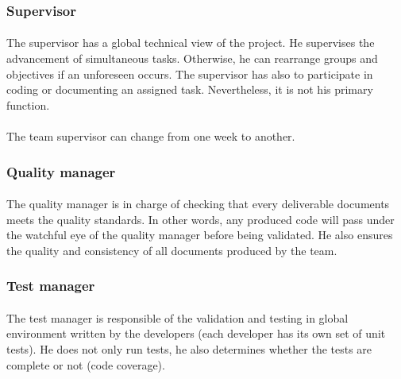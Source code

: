 \documentclass{report}
\begin{document}
\subsubsection{Supervisor}

\paragraph{}
\hspace{4mm}\textnormal{The supervisor has a global technical view of the project. He supervises the advancement of simultaneous tasks. Otherwise, he can rearrange groups and objectives if an unforeseen occurs. The supervisor has also to participate in coding or documenting an assigned task. Nevertheless, it is not his primary function.}

\paragraph{}
\hspace{4mm}\textnormal{The team supervisor can change from one week to another.}

\subsubsection{Quality manager}

\paragraph{}
\hspace{4mm}\textnormal{The quality manager is in charge of checking that every deliverable documents meets the quality standards. In other words, any produced code will pass under the watchful eye of the quality manager before being validated. He also ensures the quality and consistency of all documents produced by the team.}

\subsubsection{Test manager}

\paragraph{}
\hspace{4mm}\textnormal{The test manager is responsible of the validation and testing in global environment written by the developers (each developer has its own set of unit tests). He does not only run tests, he also determines whether the tests are complete or not (code coverage).}
\end{document}
